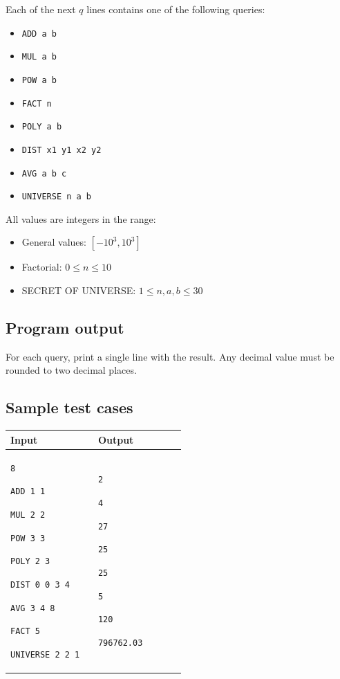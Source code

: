 \documentclass[11pt,a4paper]{article}
\newenvironment{sample}[2]{
  \begin{tcolorbox}[title=Prueba \##1, colback=white, colframe=black, sharp corners,
    fonttitle=\bfseries, breakable]
    \begin{tabular}{|p{0.45\linewidth}|p{0.45\linewidth}|}
      \hline
      \textbf{Input} & \textbf{Output} \\
      \hline
      }{\\ \hline
    \end{tabular}
  \end{tcolorbox}
}
\begin{document}
Each of the next \(q\) lines contains one of the following queries:

\begin{itemize}
  \item \texttt{ADD a b}
  \item \texttt{MUL a b}
  \item \texttt{POW a b}
  \item \texttt{FACT n}
  \item \texttt{POLY a b}
  \item \texttt{DIST x1 y1 x2 y2}
  \item \texttt{AVG a b c}
  \item \texttt{UNIVERSE n a b}
\end{itemize}

All values are integers in the range:
\begin{itemize}
  \item General values: \([-10^3, 10^3]\)
  \item Factorial: \(0 \leq n \leq 10\)
  \item SECRET OF UNIVERSE: \(1 \leq n,a,b \leq 30\)
\end{itemize}

\subsection*{Program output}

For each query, print a single line with the result. Any decimal value must be rounded to two decimal places.

\subsection*{Sample test cases}

\begin{sample}{1}{}
\texttt{8}

\texttt{ADD 1 1}

\texttt{MUL 2 2}

\texttt{POW 3 3}

\texttt{POLY 2 3}

\texttt{DIST 0 0 3 4}

\texttt{AVG 3 4 8}

\texttt{FACT 5}

\texttt{UNIVERSE 2 2 1}

&
\texttt{2}

\texttt{4}

\texttt{27}

\texttt{25}

\texttt{25}

\texttt{5}

\texttt{120}

\texttt{796762.03}

\end{sample}
\end{document}
